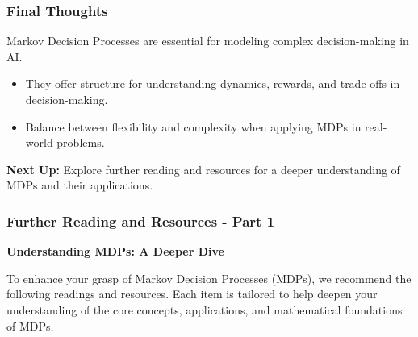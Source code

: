 \documentclass[aspectratio=169]{beamer}
\begin{document}
\begin{frame}[fragile]
    \frametitle{Final Thoughts}
    Markov Decision Processes are essential for modeling complex decision-making in AI.
    
    \begin{itemize}
        \item They offer structure for understanding dynamics, rewards, and trade-offs in decision-making.
        \item Balance between flexibility and complexity when applying MDPs in real-world problems.
    \end{itemize}
    
    \textbf{Next Up:} Explore further reading and resources for a deeper understanding of MDPs and their applications.
\end{frame}

\begin{frame}[fragile]
    \frametitle{Further Reading and Resources - Part 1}
    \textbf{Understanding MDPs: A Deeper Dive}
    
    To enhance your grasp of Markov Decision Processes (MDPs), we recommend the following readings and resources. Each item is tailored to help deepen your understanding of the core concepts, applications, and mathematical foundations of MDPs.
\end{frame}
\end{document}
